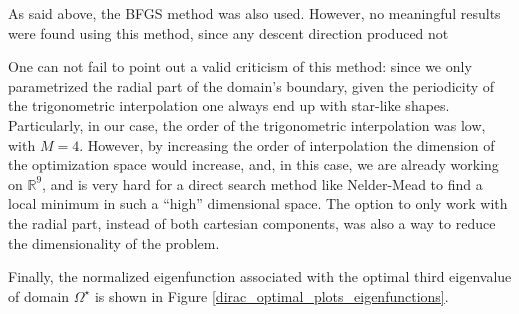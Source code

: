 \begin{figure}[!htb]
\begin{minipage}{.5\textwidth}
        \captionsetup{width=0.8\linewidth} %
        \label{dirac_val_third}
    \end{minipage}
\end{figure}

As said above, the \ac{BFGS} method was also used. However, no meaningful results were found using this method, since any descent direction produced not  

\begin{remark}
    One can not fail to point out a valid criticism of this method: since we only parametrized the radial part of the domain's boundary, given the periodicity of the trigonometric interpolation one always end up with star-like shapes. Particularly, in our case, the order of the trigonometric interpolation was low, with \(M=4\). However, by increasing the order of interpolation the dimension of the optimization space would increase, and, in this case, we are already working on \(\mathbb{R}^9\), and is very hard for a direct search method like Nelder-Mead to find a local minimum in such a ``high'' dimensional space. The option to only work with the radial part, instead of both cartesian components, was also a way to reduce the dimensionality of the problem. 
\end{remark}

Finally, the normalized eigenfunction associated with the optimal third eigenvalue of domain \(\Omega^\star\) is shown in Figure \ref{dirac_optimal_plots_eigenfunctions}.

